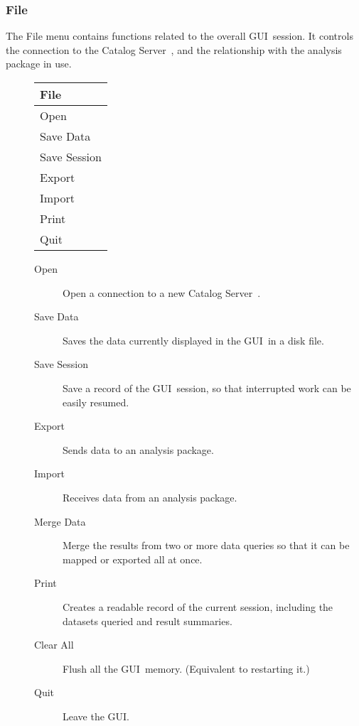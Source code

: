 \documentclass[10pt]{report}
\newcommand{\cs}{Catalog Server}
\newcommand{\gui}{GUI}
\begin{document}
\subsubsection{File}
\label{sec:menu:file}
The File menu contains functions related to the overall \gui\
session.  It controls the connection to the \cs\ , and the
relationship with the analysis package in use.
\begin{description}
\item[]
  \begin{center}
    \begin{tabular}[c]{|l|} \hline
      \textbf{File} \\ \hline
      Open \\
      Save Data \\
      Save Session \\
      Export \\
      Import \\
      Print \\
      Quit \\ \hline
    \end{tabular}
  \end{center}
  
  \begin{description}
  \item[Open] Open a connection to a new \cs\ .
  \item[Save Data] Saves the data currently displayed in the \gui\ in
    a disk file.
  \item[Save Session] Save a record of the \gui\ session, so that
    interrupted work can be easily resumed.
  \item[Export] Sends data to an analysis package.
  \item[Import] Receives data from an analysis package.
  \item[Merge Data] Merge the results from two or more data queries
    so that it can be mapped or exported all at once.
  \item[Print] Creates a readable record of the current session,
    including the datasets queried and result summaries.
  \item[Clear All] Flush all the \gui\ memory.  (Equivalent to
    restarting it.)
  \item[Quit] Leave the \gui .
  \end{description}
\end{description}
\end{document}
